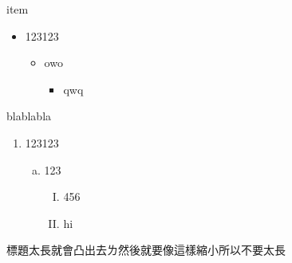\documentclass[aspectratio=169]{beamer}
\begin{document}
\begin{frame}{item}
    \begin{itemize}
        \item 123123
            \begin{itemize}
                \item<2-> owo
                    \begin{itemize}
                        \item<3-> qwq
                    \end{itemize}
            \end{itemize}
    \end{itemize}
     blablabla
    \begin{enumerate}
        \item 123123
            \begin{enumerate}[a.]
                \item 123
                    \begin{enumerate}[I.]
                        \item 456
                        \item hi
                    \end{enumerate}
            \end{enumerate}
    \end{enumerate}
\end{frame}

\begin{frame}{\footnotesize 標題太長就會凸出去ㄌ然後就要像這樣縮小所以不要太長}

    

\end{frame}
\end{document}
